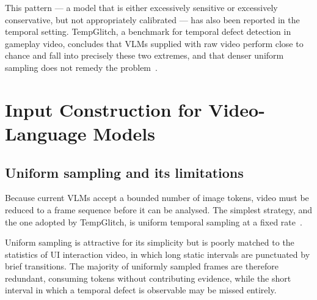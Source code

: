 This pattern --- a model that is either excessively sensitive or
excessively conservative, but not appropriately calibrated --- has also
been reported in the temporal setting. TempGlitch, a benchmark for
temporal defect detection in gameplay video, concludes that VLMs supplied
with raw video perform close to chance and fall into precisely these two
extremes, and that denser uniform sampling does not remedy the
problem~\citep{tempglitch}.


\section{Input Construction for Video-Language Models}
\label{sec:input}

\subsection{Uniform sampling and its limitations}
\label{sec:input-uniform}

Because current VLMs accept a bounded number of image tokens, video must
be reduced to a frame sequence before it can be analysed. The simplest
strategy, and the one adopted by TempGlitch, is uniform temporal sampling
at a fixed rate~\citep{tempglitch}.

Uniform sampling is attractive for its simplicity but is poorly matched to
the statistics of UI interaction video, in which long static intervals are
punctuated by brief transitions. The majority of uniformly sampled frames
are therefore redundant, consuming tokens without contributing evidence,
while the short interval in which a temporal defect is observable may be
missed entirely.

